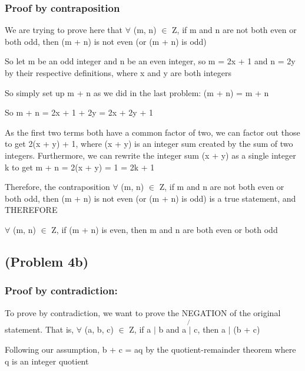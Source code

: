 \documentclass{article}
\begin{document}
\subsubsection{Proof by contraposition}

We are trying to prove here that $\forall$ (m, n) $\in$ Z, if m and n are not both even or both odd, then (m + n) is not even (or (m + n) is odd)
\par\vspace{0.5cm}\noindent
So let m be an odd integer and n be an even integer, so m = 2x + 1 and n = 2y by their respective definitions, where x and y are both integers
\par\vspace{0.5cm}\noindent
So simply set up m + n as we did in the last problem: (m + n) = m + n
\par\vspace{0.5cm}\noindent
So m + n = 2x + 1 + 2y = 2x + 2y + 1
\par\noindent
As the first two terms both have a common factor of two, we can factor out those to get 2(x + y) + 1, where (x + y) is an integer sum created by the sum of two integers.  Furthermore, we can rewrite the integer sum (x + y) as a single integer k to get m + n = 2(x + y) = 1 = 2k + 1
\par\vspace{0.5cm}\noindent
\par\vspace{0.5cm}\noindent Therefore, the contraposition $\forall$ (m, n) $\in$ Z, if m and n are not both even or both odd, then (m + n) is not even (or (m + n) is odd) is a true statement, and THEREFORE
\par\vspace{0.5cm}\noindent$\forall$ (m, n) $\in$ Z, if (m + n) is even, then m and n are both even or both odd

\subsection{(Problem 4b)}
\subsubsection{Proof by contradiction: }

To prove by contradiction, we want to prove the NEGATION of the original statement.  That is, $\forall$ (a, b, c) $\in$ Z, if a $\mid$ b and a $\not{|}$ c, then a $\mid$ (b + c)
\par\vspace{0.5cm}\noindent
Following our assumption, b + c = aq by the quotient-remainder theorem where q is an integer quotient
\end{document}
